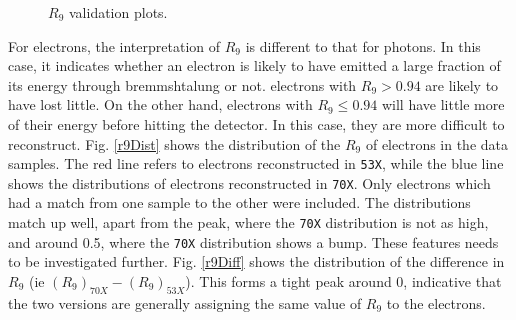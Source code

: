 \documentclass[10pt]{article}
\begin{document}
\begin{figure}[h!]
        \caption{$R_9$ validation plots.}\label{r9Validation}
\end{figure}

For electrons, the interpretation of $R_9$ is different to that for photons. In this case, it indicates whether an electron is likely to have emitted a large fraction of its energy through bremmshtalung or not. electrons with $R_9>0.94$ are likely to have lost little. On the other hand, electrons with $R_9\leq 0.94$ will have little more of their energy before hitting the detector. In this case, they are more difficult to reconstruct. Fig. \ref{r9Dist} shows the distribution of the $R_9$ of electrons in the data samples. The red line refers to electrons reconstructed in \texttt{53X}, while the blue line shows the distributions of electrons reconstructed in \texttt{70X}. Only electrons which had a match from one sample to the other were included. The distributions match up well, apart from the peak, where the \texttt{70X} distribution is not as high, and around 0.5, where the \texttt{70X} distribution shows a bump. These features needs to be investigated further. Fig. \ref{r9Diff} shows the distribution of the difference in $R_9$ (ie $(R_9)_{70X} -(R_9)_{53X}$). This forms a tight peak around 0, indicative that the two versions are generally assigning the same value of $R_9$ to the electrons.
\end{document}
